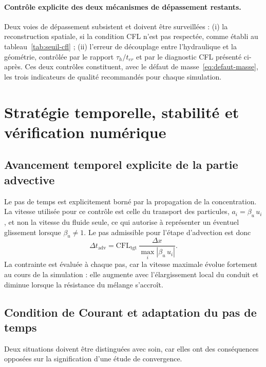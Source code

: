 \documentclass[11pt,a4paper]{report}
\newcommand{\ter}{{t_{er}}}
\newcommand{\dt}{\Delta t}
\begin{document}
\paragraph{Contrôle explicite des deux mécanismes de dépassement restants.} Deux voies de dépassement
subsistent et doivent être surveillées : (i) la reconstruction spatiale, si la condition CFL n'est pas
respectée, comme établi au tableau~\ref{tab:seuil-cfl} ; (ii) l'erreur de découplage entre l'hydraulique
et la géométrie, contrôlée par le rapport \(\tau_h/\ter\) et par le diagnostic CFL présenté ci-après.
Ces deux contrôles constituent, avec le défaut de masse~\eqref{eq:defaut-masse}, les trois indicateurs de
qualité recommandés pour chaque simulation.

\section{Stratégie temporelle, stabilité et vérification numérique}
\label{sec:verification}

\subsection{Avancement temporel explicite de la partie advective}

Le pas de temps est explicitement borné par la propagation de la concentration. La vitesse utilisée pour
ce contrôle est celle du transport des particules, \(a_i = \beta_u\,u_i\), et non la vitesse du fluide
seule, ce qui autorise à représenter un éventuel glissement lorsque \(\beta_u\neq1\). Le pas admissible
pour l'étape d'advection est donc
\begin{equation}
\dt_{\mathrm{adv}} = \mathrm{CFL}_{\mathrm{tgt}}\,
\frac{\Delta x}{\max_i\left|\beta_u\,u_i\right|}.
\label{eq:dt-adv}
\end{equation}
La contrainte est évaluée à chaque pas, car la vitesse maximale évolue fortement au cours de la
simulation : elle augmente avec l'élargissement local du conduit et diminue lorsque la résistance du
mélange s'accroît.

\subsection{Condition de Courant et adaptation du pas de temps}

Deux situations doivent être distinguées avec soin, car elles ont des conséquences opposées sur la
signification d'une étude de convergence.
\end{document}
